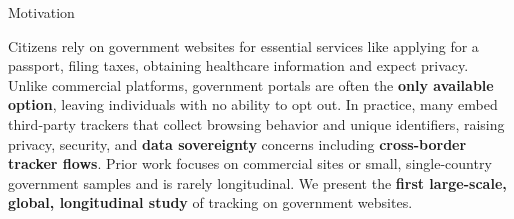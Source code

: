   \begin{block}{Motivation}

    Citizens rely on government websites for essential services like applying for a passport, filing taxes, obtaining healthcare information and expect privacy. Unlike commercial platforms, government portals are often the \textbf{only available option}, leaving individuals with no ability to opt out. In practice, many embed third-party trackers that collect browsing behavior and unique identifiers, raising privacy, security, and \textbf{data sovereignty} concerns including \textbf{cross-border tracker flows}. Prior work focuses on commercial sites or small, single-country government samples and is rarely longitudinal. We present the \textbf{first large-scale, global, longitudinal study} of tracking on government websites.

  \end{block}
